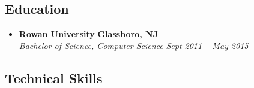 \subsection*{Education}

\begin{itemize}
  \parskip=0.1em

  \item
  \headerrow
    {\textbf{Rowan University}}
    {\textbf{Glassboro, NJ}}
  \\
  \headerrow
    {\emph{Bachelor of Science, Computer Science}}
    {\emph{Sept 2011 -- May 2015}}

\end{itemize}

\subsection*{Technical Skills}


